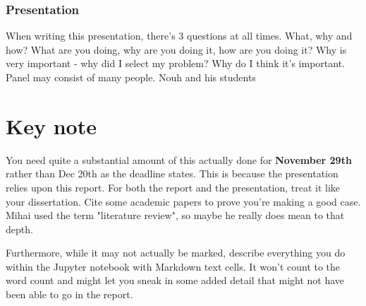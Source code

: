 \documentclass[12pt]{report}
\begin{document}
\subsection{Presentation}
When writing this presentation, there's 3 questions at all times. What, why and how?
What are you doing, why are you doing it, how are you doing it?
Why is very important - why did I select my problem? Why do I think it's important.
Panel may consist of many people. Nouh and his students

\chapter{Key note}
You need quite a substantial amount of this actually done for \textbf{November 29th} rather than Dec 20th as the 
deadline states. This is because the presentation relies upon this report. For both the report and the presentation,
treat it like your dissertation. Cite some academic papers to prove you're making a good case. Mihai used the 
term "literature review", so maybe he really does mean to that depth.

Furthermore, while it may not actually be marked, describe everything you do within the Jupyter notebook with 
Markdown text cells. It won't count to the word count and might let you sneak in some added detail that might not 
have been able to go in the report.
\end{document}
